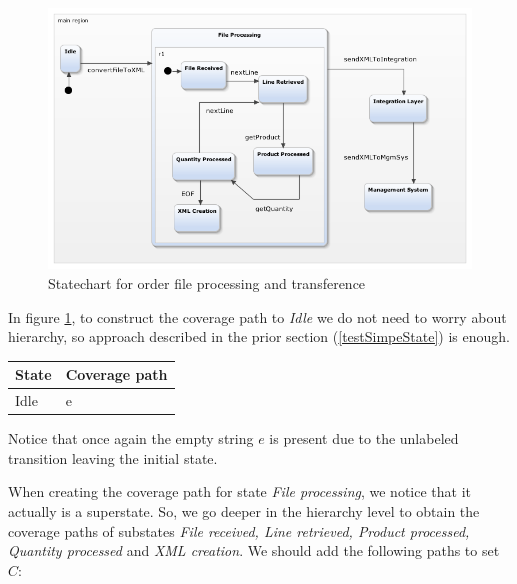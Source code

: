 \begin{figure}[htb]
\centering
\includegraphics[width=15cm]{figuras/webEDI}
\caption{\label{fig:webEDI} Statechart for order file processing and transference}
\end{figure}

In figure \ref{fig:webEDI}, to construct the coverage path to \textit{Idle} we do not need to worry about hierarchy, so approach described in the prior section (\ref{testSimpeState}) is enough.

\begin{center}
\begin{tabular}{| l | l|}

\hline

State & Coverage path \\ \hline

Idle & e \\

\hline
\end{tabular}
\end{center}

Notice that once again the empty string $e$ is present due to the unlabeled transition leaving the initial state.

When creating the coverage path for state \textit{File processing}, we notice that it actually is a superstate. So, we go deeper in the hierarchy level to obtain the coverage paths of substates \textit{File received, Line retrieved, Product processed, Quantity processed} and \textit{XML creation}. We should add the following paths to set $C$:

